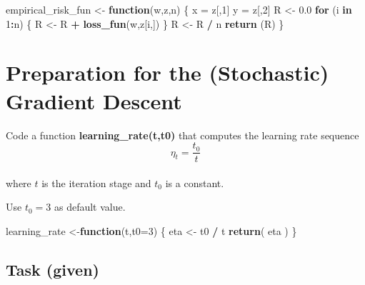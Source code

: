\documentclass[
]{article}
\newenvironment{Shaded}{\begin{snugshade}}{\end{snugshade}}
\newcommand{\ControlFlowTok}[1]{\textcolor[rgb]{0.13,0.29,0.53}{\textbf{#1}}}
\newcommand{\DataTypeTok}[1]{\textcolor[rgb]{0.13,0.29,0.53}{#1}}
\newcommand{\DecValTok}[1]{\textcolor[rgb]{0.00,0.00,0.81}{#1}}
\newcommand{\FloatTok}[1]{\textcolor[rgb]{0.00,0.00,0.81}{#1}}
\newcommand{\KeywordTok}[1]{\textcolor[rgb]{0.13,0.29,0.53}{\textbf{#1}}}
\newcommand{\NormalTok}[1]{#1}
\newcommand{\OperatorTok}[1]{\textcolor[rgb]{0.81,0.36,0.00}{\textbf{#1}}}
\newcommand{\StringTok}[1]{\textcolor[rgb]{0.31,0.60,0.02}{#1}}
\begin{document}
\begin{Shaded}
\begin{Highlighting}[]
\NormalTok{empirical\_risk\_fun \textless{}{-}}\StringTok{ }\ControlFlowTok{function}\NormalTok{(w,z,n) \{}
\NormalTok{  x =}\StringTok{ }\NormalTok{z[,}\DecValTok{1}\NormalTok{]}
\NormalTok{  y =}\StringTok{ }\NormalTok{z[,}\DecValTok{2}\NormalTok{]}
\NormalTok{  R \textless{}{-}}\StringTok{ }\FloatTok{0.0}
  \ControlFlowTok{for}\NormalTok{ (i }\ControlFlowTok{in} \DecValTok{1}\OperatorTok{:}\NormalTok{n) \{}
\NormalTok{    R \textless{}{-}}\StringTok{ }\NormalTok{R }\OperatorTok{+}\StringTok{ }\KeywordTok{loss\_fun}\NormalTok{(w,z[i,])}
\NormalTok{  \}}
\NormalTok{  R \textless{}{-}}\StringTok{ }\NormalTok{R }\OperatorTok{/}\StringTok{ }\NormalTok{n}
  \KeywordTok{return}\NormalTok{ (R)}
\NormalTok{\}}
\end{Highlighting}
\end{Shaded}

\hypertarget{preparation-for-the-stochastic-gradient-descent}{%
\section*{Preparation for the (Stochastic) Gradient
Descent}\label{preparation-for-the-stochastic-gradient-descent}}

Code a function \textbf{learning\_rate(t,t0)} that computes the learning
rate sequence \[
\eta_{t}=\frac{t_0}{t}
\]\\
where \(t\) is the iteration stage and \(t_0\) is a constant.

Use \(t_0=3\) as default value.

\begin{Shaded}
\begin{Highlighting}[]
\NormalTok{learning\_rate \textless{}{-}}\ControlFlowTok{function}\NormalTok{(t,}\DataTypeTok{t0=}\DecValTok{3}\NormalTok{) \{}
\NormalTok{  eta \textless{}{-}}\StringTok{ }\NormalTok{t0 }\OperatorTok{/}\StringTok{ }\NormalTok{t}
  \KeywordTok{return}\NormalTok{( eta )}
\NormalTok{\}}
\end{Highlighting}
\end{Shaded}

\hypertarget{task-given}{%
\subsection{Task (given)}\label{task-given}}
\end{document}

